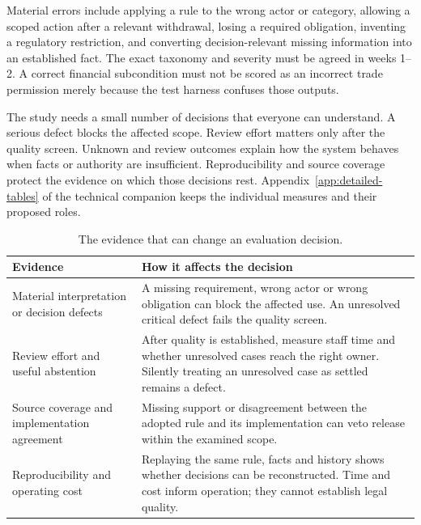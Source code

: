 Material errors include applying a rule to the wrong actor or category, allowing
a scoped action after a relevant withdrawal, losing a required obligation,
inventing a regulatory restriction, and converting decision-relevant missing
information into an established fact. The exact taxonomy and severity must be
agreed in weeks 1--2. A correct financial subcondition must not be scored as an
incorrect trade permission merely because the test harness confuses those outputs.


The study needs a small number of decisions that everyone can understand. A
serious defect blocks the affected scope. Review effort matters only after the
quality screen. Unknown and review outcomes explain how the system behaves when
facts or authority are insufficient. Reproducibility and source coverage protect
the evidence on which those decisions rest. Appendix~\ref{app:detailed-tables} of the technical companion
keeps the individual measures and their proposed roles.

\begin{table}[H]
\centering
\caption{The evidence that can change an evaluation decision.}
\label{tab:evaluation}
\begin{tabularx}{\textwidth}{P{48mm}Y}
\toprule
Evidence & How it affects the decision\\
\midrule
Material interpretation or decision defects & A missing requirement, wrong actor or wrong obligation can block the affected use. An unresolved critical defect fails the quality screen.\\
\addlinespace[0.5em]
Review effort and useful abstention & After quality is established, measure staff time and whether unresolved cases reach the right owner. Silently treating an unresolved case as settled remains a defect.\\
\addlinespace[0.5em]
Source coverage and implementation agreement & Missing support or disagreement between the adopted rule and its implementation can veto release within the examined scope.\\
\addlinespace[0.5em]
Reproducibility and operating cost & Replaying the same rule, facts and history shows whether decisions can be reconstructed. Time and cost inform operation; they cannot establish legal quality.\\
\bottomrule
\end{tabularx}
\end{table}

